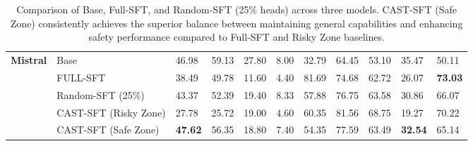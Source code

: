 \begin{table}[t]
{\begin{tabular}{cllllllllll}
\multirow{5}{*}{\textbf{Mistral}} 
 & Base & 46.98 & 59.13 & 27.80 & 8.00 & 32.79 & 64.45 & 53.10 & 35.47 & 50.11 \\
 & FULL-SFT & 38.49 & 49.78 & 11.60 & 4.40 & 81.69 & 74.68 & 62.72 & 26.07 & \textbf{73.03} \\ \cmidrule{2-11}
 & Random-SFT (25\%) & 43.37 & 52.39 & 19.40 & 8.33 & 57.88 & 76.75 & 63.58 & 30.86 & 66.07 \\
 & CAST-SFT (Risky Zone) & 27.78 & 25.72 & 19.00 & 4.60 & 60.35 & 81.56 & 68.75 & 19.27 & 70.22 \\
 & \cellcolor{pale_green}CAST-SFT (Safe Zone) & \cellcolor{pale_green}\textbf{47.62} & \cellcolor{pale_green}56.35 & \cellcolor{pale_green}18.80 & \cellcolor{pale_green}7.40 & \cellcolor{pale_green}54.35 & \cellcolor{pale_green}77.59 & \cellcolor{pale_green}63.49 & \cellcolor{pale_green}\textbf{32.54} & \cellcolor{pale_green}65.14 \\ \bottomrule
\end{tabular}
}
\caption{\small
Comparison of Base, Full-SFT, and Random-SFT (25\% heads) across three models. CAST-SFT (Safe Zone) consistently achieves the superior balance between maintaining general capabilities and enhancing safety performance compared to Full-SFT and Risky Zone baselines.}
\label{tab:sft_results}
\end{table}